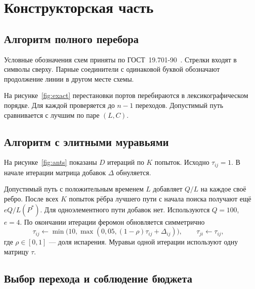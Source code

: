 \clearpage
\section{Конструкторская часть}

\subsection{Алгоритм полного перебора}

Условные обозначения схем приняты по ГОСТ~19.701-90~\cite{flowstandard}.
Стрелки входят в символы сверху. Парные соединители с одинаковой буквой обозначают продолжение линии в другом месте схемы.

На рисунке~\ref{fig:exact} перестановки портов перебираются в лексикографическом порядке. Для каждой проверяется до $n-1$ переходов. Допустимый путь сравнивается с лучшим по паре $(L,C)$.


\clearpage
\subsection{Алгоритм с элитными муравьями}

На рисунке~\ref{fig:ants} показаны $D$ итераций по $K$ попыток. Исходно $\tau_{ij}=1$. В начале итерации матрица добавок $\Delta$ обнуляется.

Допустимый путь с положительным временем $L$ добавляет $Q/L$ на каждое своё ребро. После всех $K$ попыток рёбра лучшего пути с начала поиска получают ещё $eQ/L(P^*)$. Для одноэлементного пути добавок нет. Используются $Q=100$, $e=4$. По окончании итерации феромон обновляется симметрично
\begin{equation}
\tau_{ij}\gets \min\!\bigl(10,\max(0{,}05,(1-\rho)\tau_{ij}+\Delta_{ij})\bigr),
\qquad \tau_{ji}\gets\tau_{ij},
\label{eq:evaporation}
\end{equation}
\hspace*{\parindent}где $\rho\in[0,1]$ --- доля испарения. Муравьи одной итерации используют одну матрицу $\tau$.


\clearpage
\subsection{Выбор перехода и соблюдение бюджета}

